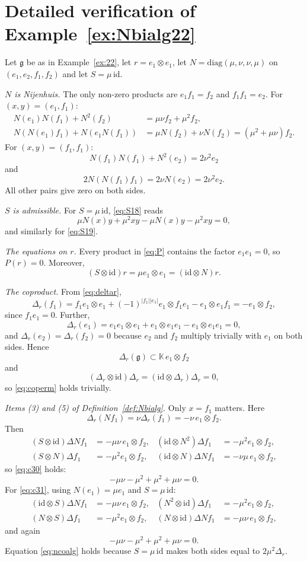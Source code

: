 \documentclass[11pt]{article}
\theoremstyle{definition}
\newcommand{\g}{\mathfrak{g}}
\newcommand{\K}{\mathbb{K}}
\newcommand{\id}{\mathrm{id}}
\begin{document}
\section{Detailed verification of Example~\ref{ex:Nbialg22}}\label{app:ex}

Let $\g$ be as in Example~\ref{ex:22}, let $r=e_1\otimes e_1$, let $N=\mathrm{diag}(\mu,\nu,\nu,\mu)$ on $(e_1,e_2,f_1,f_2)$ and let $S=\mu\,\id$.

\medskip\noindent\emph{$N$ is Nijenhuis.}
The only non-zero products are $e_1f_1=f_2$ and $f_1f_1=e_2$. For $(x,y)=(e_1,f_1)$:
\[
\begin{aligned}
N(e_1)N(f_1)+N^2(f_2)&=\mu\nu f_2+\mu^2f_2,\\
N(N(e_1)f_1)+N(e_1N(f_1))&=\mu N(f_2)+\nu N(f_2)=(\mu^2+\mu\nu)f_2.
\end{aligned}
\]
For $(x,y)=(f_1,f_1)$:
\[
N(f_1)N(f_1)+N^2(e_2)=2\nu^2e_2
\]
and
\[
2N(N(f_1)f_1)=2\nu N(e_2)=2\nu^2e_2.
\]
All other pairs give zero on both sides.

\medskip\noindent\emph{$S$ is admissible.}
For $S=\mu\,\id$, \eqref{eq:S18} reads
\[
\mu N(x)y+\mu^2xy-\mu N(x)y-\mu^2xy=0,
\]
and similarly for \eqref{eq:S19}.

\medskip\noindent\emph{The equations on $r$.}
Every product in \eqref{eq:P} contains the factor $e_1e_1=0$, so $P(r)=0$. Moreover,
\[
(S\otimes\id)r=\mu e_1\otimes e_1=(\id\otimes N)r.
\]

\medskip\noindent\emph{The coproduct.}
From \eqref{eq:deltar},
\[
\Delta_r(f_1)=f_1e_1\otimes e_1+(-1)^{|f_1||e_1|}e_1\otimes f_1e_1-e_1\otimes e_1f_1=-e_1\otimes f_2,
\]
since $f_1e_1=0$. Further,
\[
\Delta_r(e_1)=e_1e_1\otimes e_1+e_1\otimes e_1e_1-e_1\otimes e_1e_1=0,
\]
and $\Delta_r(e_2)=\Delta_r(f_2)=0$ because $e_2$ and $f_2$ multiply trivially with $e_1$ on both sides. Hence
\[
\Delta_r(\g)\subset\K\,e_1\otimes f_2
\]
and
\[
(\Delta_r\otimes\id)\Delta_r=(\id\otimes\Delta_r)\Delta_r=0,
\]
so \eqref{eq:coperm} holds trivially.

\medskip\noindent\emph{Items (3) and (5) of Definition~\ref{def:Nbialg}.}
Only $x=f_1$ matters. Here
\[
\Delta_r(N f_1)=\nu\Delta_r(f_1)=-\nu\,e_1\otimes f_2.
\]
Then
\begin{align*}
(S\otimes\id)\Delta N f_1&=-\mu\nu\,e_1\otimes f_2,
& (\id\otimes N^2)\Delta f_1&=-\mu^2e_1\otimes f_2,\\
(S\otimes N)\Delta f_1&=-\mu^2e_1\otimes f_2,
& (\id\otimes N)\Delta Nf_1&=-\nu\mu\,e_1\otimes f_2,
\end{align*}
so \eqref{eq:c30} holds:
\[
-\mu\nu-\mu^2+\mu^2+\mu\nu=0.
\]
For \eqref{eq:c31}, using $N(e_1)=\mu e_1$ and $S=\mu\,\id$:
\begin{align*}
(\id\otimes S)\Delta Nf_1&=-\mu\nu\,e_1\otimes f_2,
& (N^2\otimes\id)\Delta f_1&=-\mu^2e_1\otimes f_2,\\
(N\otimes S)\Delta f_1&=-\mu^2e_1\otimes f_2,
& (N\otimes\id)\Delta Nf_1&=-\mu\nu\,e_1\otimes f_2,
\end{align*}
and again
\[
-\mu\nu-\mu^2+\mu^2+\mu\nu=0.
\]
Equation \eqref{eq:ncoalg} holds because $S=\mu\,\id$ makes both sides equal to $2\mu^2\Delta_r$.
\end{document}
